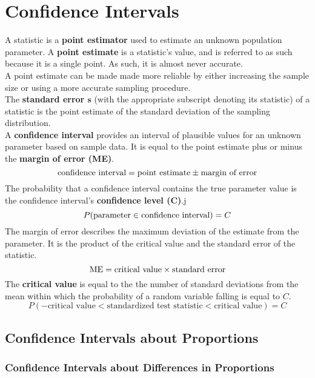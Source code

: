 \documentclass[../AP_Statistics.tex]{subfiles}
\begin{document}
	\chapter{Confidence Intervals}
		A statistic is a \textbf{point estimator} used to estimate an unknown population parameter. A \textbf{point estimate} is a statistic's value, and is referred to as such because it is a single point. As such, it is almost never accurate. \\
		A point estimate can be made made more reliable by either increasing the sample size or using a more accurate sampling procedure. \\
		The \textbf{standard error $\bm{s}$} (with the appropriate subscript denoting its statistic) of a statistic is the point estimate of the standard deviation of the sampling distribution. \\
		A \textbf{confidence interval} provides an interval of plausible values for an unknown parameter based on sample data. It is equal to the point estimate plus or minus the \textbf{margin of error (ME)}.
		\[\text{confidence interval} = \text{point estimate} \pm \text{margin of error}\]
		The probability that a confidence interval contains the true parameter value is the confidence interval's \textbf{confidence level ($\bm{C}$)}.j
		\[P(\text{parameter} \in \text{confidence interval}) = C\]
		The margin of error describes the maximum deviation of the estimate from the parameter. It is the product of the critical value and the standard error of the statistic.
		\[\operatorname{ME} = \text{critical value} \times \text{standard error}\]
		The \textbf{critical value} is equal to the the number of standard deviations from the mean within which the probability of a random variable falling is equal to $C$.
		\[P(-\text{critical value} < \text{standardized test statistic} < \text{critical value}) = C\]
		\section{Confidence Intervals about Proportions}
			\subsection*{Confidence Intervals about Differences in Proportions}
\end{document}
